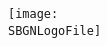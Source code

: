 \begin{titlepage}
\begin{center}
\vfill


\vfill

\centerline{\texttt{[image: \\SBGNLogoFile]}}

\end{center}

\end{titlepage}

%
%

\setcounter{page}{2}
